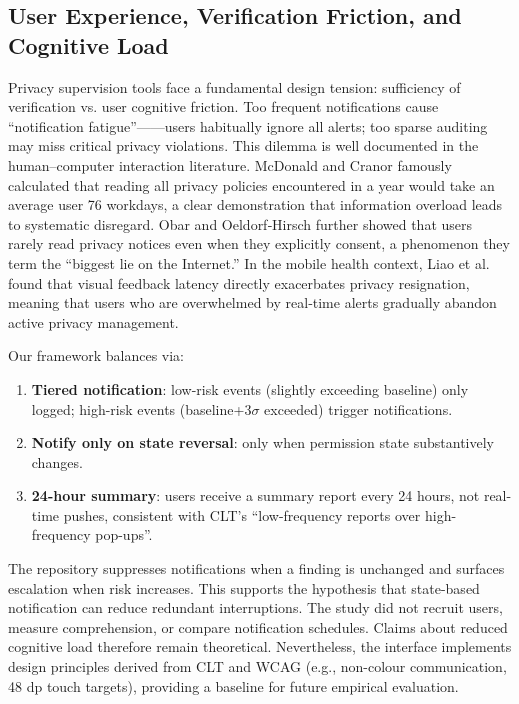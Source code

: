 \subsection{User Experience, Verification Friction, and Cognitive Load}

Privacy supervision tools face a fundamental design tension: sufficiency of verification vs. user cognitive friction. Too frequent notifications cause ``notification fatigue''——users habitually ignore all alerts; too sparse auditing may miss critical privacy violations. This dilemma is well documented in the human–computer interaction literature. McDonald and Cranor \cite{12} famously calculated that reading all privacy policies encountered in a year would take an average user 76 workdays, a clear demonstration that information overload leads to systematic disregard. Obar and Oeldorf‐Hirsch \cite{13} further showed that users rarely read privacy notices even when they explicitly consent, a phenomenon they term the ``biggest lie on the Internet.'' In the mobile health context, Liao et al. \cite{14} found that visual feedback latency directly exacerbates privacy resignation, meaning that users who are overwhelmed by real‑time alerts gradually abandon active privacy management.

Our framework balances via:
\begin{enumerate}
\item \textbf{Tiered notification}: low-risk events (slightly exceeding baseline) only logged; high-risk events (baseline+3$\sigma$ exceeded) trigger notifications.
\item \textbf{Notify only on state reversal}: only when permission state substantively changes.
\item \textbf{24-hour summary}: users receive a summary report every 24 hours, not real-time pushes, consistent with CLT's ``low-frequency reports over high-frequency pop-ups''.
\end{enumerate}

The repository suppresses notifications when a finding is unchanged and surfaces escalation when risk increases. This supports the hypothesis that state-based notification can reduce redundant interruptions. The study did not recruit users, measure comprehension, or compare notification schedules. Claims about reduced cognitive load therefore remain theoretical. Nevertheless, the interface implements design principles derived from CLT and WCAG (e.g., non-colour communication, 48 dp touch targets), providing a baseline for future empirical evaluation.

